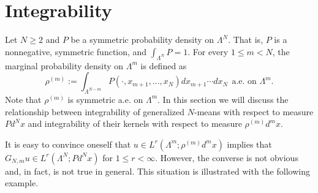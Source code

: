 \documentclass[12pt,leqno]{amsart}
\numberwithin{equation}{section}
\numberwithin{theor}{section}
\numberwithin{rem}{section}
\begin{document}
\section{Integrability\label{sec_integ}}

Let $N\geq 2$ and $P$ be a symmetric probability density 
on $\Lambda^N$.  That is, $P$ is a nonnegative, symmetric function, and $\int_{\Lambda^N} P=1$.  For every 
$1\leq m<N$, the marginal probability density 
on $\Lambda^m$ is defined as 
\begin{equation}
\label{rho^m_def}
\rho^{(m)}:=\int_{\Lambda^{N-m}} P(\cdot,x_{m+1},...,x_N)dx_{m+1}\cdots dx_{N}~~\text{a.e. on $\Lambda^m$}.  
\end{equation}
Note that $\rho^{(m)}$ is symmetric a.e. on $\Lambda^m$.  
In this section we will discuss the relationship between integrability of generalized $N$-means with respect to measure $Pd^{N}x$ and integrability of their kernels with respect to measure $\rho^{(m)}d^{m}x$. 

It is easy to convince oneself that $u\in L^{r}(\Lambda^m;
\rho^{(m)} d^{m} x)$ implies that 
$G_{N,m}u\in L^{r}(\Lambda^N;P d^{N} x)$ for 
$1\leq r<\infty$.  However, the converse 
is not obvious and, in fact, is not true in general.  This situation is illustrated with the following example.  
\end{document}

